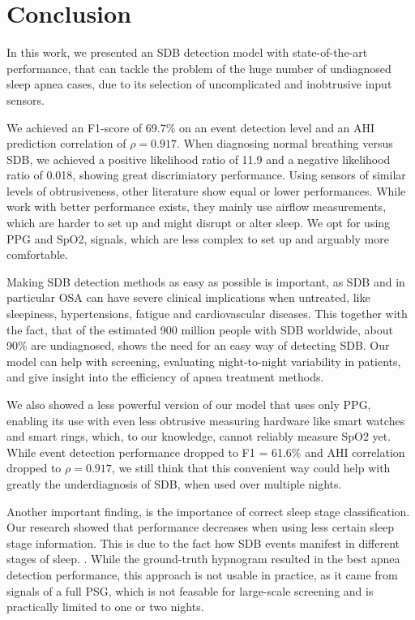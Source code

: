 \chapter{Conclusion \label{Chapter-Conclusion}}

In this work, we presented an SDB detection model with state-of-the-art performance, that can tackle the problem of the huge number of undiagnosed sleep apnea cases, due to its selection of uncomplicated and inobtrusive input sensors.

We achieved an F1-score of 69.7\% on an event detection level and an AHI prediction correlation of $\rho = 0.917$. When diagnosing normal breathing versus SDB, we achieved a positive likelihood ratio of 11.9 and a negative likelihood ratio of 0.018, showing great discrimiatory performance.
Using sensors of similar levels of obtrusiveness, other literature show equal or lower performances.
While work with better performance exists, they mainly use airflow measurements, which are harder to set up and might disrupt or alter sleep. We opt for using PPG and SpO2, signals, which are less complex to set up and arguably more comfortable.

Making SDB detection methods as easy as possible is important, as SDB and in particular OSA can have severe clinical implications when untreated, like sleepiness, hypertensions, fatigue and cardiovascular diseases. This together with the fact, that of the estimated 900 million people with SDB worldwide, about 90\% are undiagnosed, shows the need for an easy way of detecting SDB. Our model can help with screening, evaluating night-to-night variability in patients, and give insight into the efficiency of apnea treatment methods.

We also showed a less powerful version of our model that uses only PPG, enabling its use with even less obtrusive measuring hardware like smart watches and smart rings, which, to our knowledge, cannot reliably measure SpO2 yet.
While event detection performance dropped to F1 = 61.6\% and AHI correlation dropped to $\rho = 0.917$, we still think that this convenient way could help with greatly the underdiagnosis of SDB, when used over multiple nights. 

Another important finding, is the importance of correct sleep stage classification. Our research showed that performance decreases when using less certain sleep stage information. This is due to the fact how SDB events manifest in different stages of sleep. . While the ground-truth hypnogram resulted in the best apnea detection performance, this approach is not usable in practice, as it came from signals of a full PSG, which is not feasable for large-scale screening and is practically limited to one or two nights.

